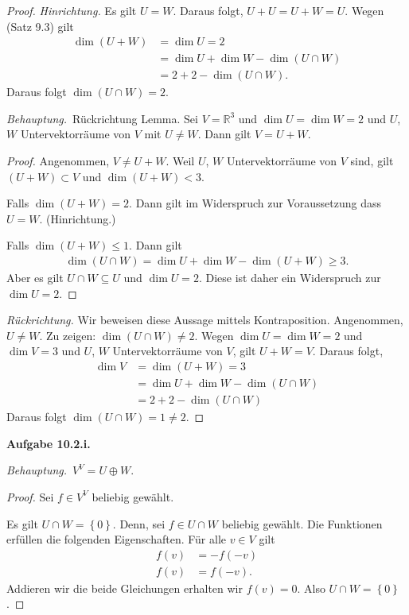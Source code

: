\documentclass[12pt]{extarticle}
\newcommand{\mg}[1]{\mathbb{#1}}
\newcommand{\aufgn}[1]{\textbf{Aufgabe #1.}}
\newcommand{\beh}{\textit{Behauptung.}\ }
\begin{document}
\begin{proof}
\textit{Hinrichtung.} Es gilt \(U = W\).  Daraus folgt, $U
+ U = U + W = U$.  Wegen (Satz 9.3) gilt
\begin{align*}
  \dim(U+W)
  &= \dim U = 2 \\
  &= \dim U + \dim W - \dim (U \cap W) \\
  &= 2 + 2 - \dim (U \cap W).
\end{align*}
Daraus folgt \(\dim (U \cap W) = 2\).

\beh Rückrichtung Lemma.  Sei \(V = \mg{R}^3\) und
\(\dim U = \dim W = 2\) und \(U\), \(W\) Untervektorräume von
\(V\) mit \(U \ne W\).  Dann gilt \(V = U + W\).

\begin{proof}
Angenommen, \(V \ne U + W\).  Weil \(U\), \(W\)
Untervektorräume von \(V\) sind, gilt \((U + W) \subset V\)
und \(\dim (U+W) < 3\).

Falls \(\dim (U+W) = 2\).  Dann gilt im Widerspruch zur
Voraussetzung dass \(U = W\).  (Hinrichtung.)

Falls \(\dim (U+W) \le 1\).  Dann gilt
\begin{align*}
\dim(U \cap W) = \dim U + \dim W - \dim(U+W) \ge 3.
\end{align*}
Aber es gilt \(U \cap W \subseteq U\) und \(\dim U = 2\).
Diese ist daher ein Widerspruch zur \(\dim U = 2\).
\end{proof}

\textit{Rückrichtung.}  Wir beweisen diese Aussage
mittels Kontraposition.  Angenommen, \(U \ne W\).  Zu
zeigen: \(\dim(U \cap W) \ne 2\).  Wegen $\dim U = \dim W
= 2$ und \(\dim V = 3\) und \(U\), \(W\) Untervektorräume von
\(V\), gilt \(U + W = V\).  Daraus folgt,
\begin{align*}
  \dim V
  &= \dim (U + W) = 3\\
  &= \dim U + \dim W - \dim (U \cap W) \\
  &= 2 + 2 - \dim (U \cap W)
\end{align*}
Daraus folgt \(\dim (U \cap W) = 1 \ne 2\).
\end{proof}

\newpage
\aufgn{10.2.i}

\beh \(V^V = U \oplus W\).

\begin{proof}
Sei \(f \in V^V\) beliebig gewählt.

Es gilt \(U \cap W = \left\{ 0 \right\}\).  Denn, sei $f
\in U \cap W$ beliebig gewählt.  Die Funktionen
erfüllen die folgenden Eigenschaften.  Für alle $v \in
V$ gilt
\begin{align*}
  f(v) &= - f(-v) \\
  f(v) &= f(-v).
\end{align*}
Addieren wir die beide Gleichungen erhalten wir $f(v) =
0$.  Also \(U \cap W = \left\{ 0 \right\}\).
\end{proof}
\end{document}
